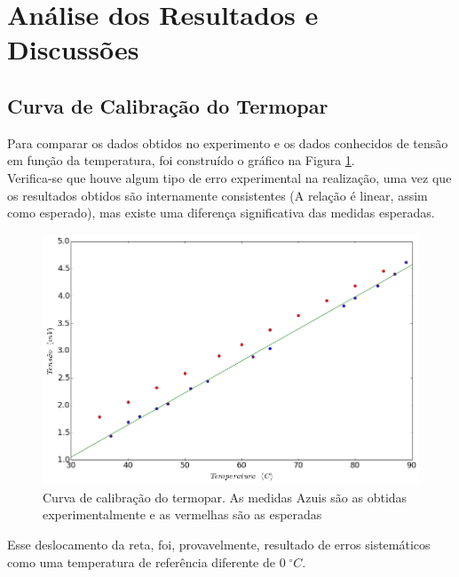 \documentclass[12pt,a4paper]{article}
\begin{document}
\section{Análise dos Resultados e Discussões}

\subsection{Curva de Calibração do Termopar}
Para comparar os dados obtidos no experimento e os dados conhecidos de tensão em função da temperatura, foi construído o gráfico na Figura \ref{termopar}.  \\
Verifica-se que houve algum tipo de erro experimental na realização, uma vez que os resultados obtidos são internamente consistentes (A relação é linear, assim como esperado), mas existe uma diferença significativa das medidas esperadas.

 
\begin{figure}[!htbp]
\includegraphics[scale=0.55]{termopar.png}
\caption{Curva de calibração do termopar. As medidas Azuis são as obtidas experimentalmente e as vermelhas são as esperadas}
\label{termopar}
\end{figure}

Esse deslocamento da reta, foi, provavelmente, resultado de erros sistemáticos como uma temperatura de referência diferente de $0 \; ^{\circ} C$.
\end{document}

